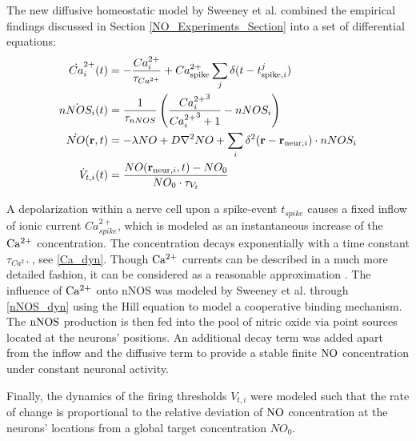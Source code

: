 \documentclass[10pt,a4paper]{article}
\begin{document}
The new diffusive homeostatic model by Sweeney et al. combined the empirical findings discussed in Section \ref{NO_Experiments_Section} into a set of differential equations:   
\begin{align}
\dot{Ca}_i^{2+}(t) &= -\frac{Ca_i^{2+}}{\tau_{Ca^{2+}}} + Ca^{2+}_{\rm spike} \sum_{j} \delta(t-t^j_{\mathrm{spike},i}) \label{Ca_dyn}\\
\dot{nNOS_i}(t) &= \frac{1}{\tau_{nNOS}} \left(\frac{{Ca_i^{2+}}^3}{{Ca_i^{2+}}^3+1} - nNOS_i \right) \label{nNOS_dyn}\\
\dot{NO}(\mathbf{r},t)&=-\lambda NO + D \nabla^2 NO + \sum_{i} \delta^2(\mathbf{r}-\mathbf{r}_{\mathrm{neur},i})\cdot nNOS_i \label{NO_dyn}\\
\dot{V}_{t,i}(t) &= \frac{NO(\mathbf{r}_{\mathrm{neur},i},t)-NO_0}{NO_0\cdot\tau_{V_t}} \label{Theta_dyn}
\end{align}

A depolarization within a nerve cell upon a spike-event $t_{spike}$ causes a fixed inflow of ionic current $Ca^{2+}_{spike}$, which is modeled as an instantaneous increase of the $\rm Ca^{2+}$ concentration. The concentration decays exponentially with a time constant $\tau_{Ca^{2+}}$, see \eqref{Ca_dyn}. Though $\rm Ca^{2+}$ currents can be described in a much more detailed fashion, it can be considered as a reasonable approximation \cite[p.~198--203]{Theor_Neur_Dayan}. The influence of $\rm Ca^{2+}$ onto nNOS was modeled by Sweeney et al. through \eqref{nNOS_dyn} using the Hill equation \cite{Hill_Equ} to model a cooperative binding mechanism. The $\rm nNOS$ production is then fed into the pool of nitric oxide via point sources located at the neurons' positions. An additional decay term was added apart from the inflow and the diffusive term to provide a stable finite $\rm NO$ concentration under constant neuronal activity.

Finally, the dynamics of the firing thresholds $V_{t,i}$ were modeled such that the rate of change is proportional to the relative deviation of $\rm NO$ concentration at the neurons' locations from a global target concentration $NO_0$. 
\end{document}
